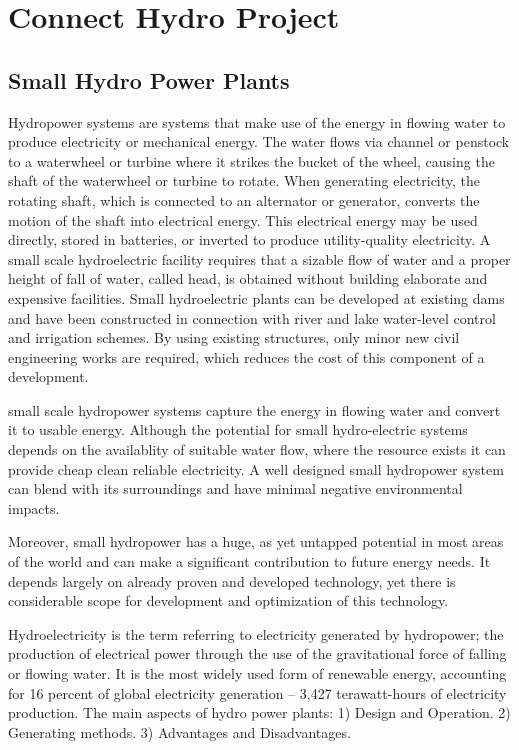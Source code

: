 \chapter{Connect Hydro Project}
\label{ChapterThree}
\section{Small Hydro Power Plants}
\label{SmallHydroPowerPlants}
Hydropower systems are systems that make use of the energy in flowing water to produce electricity or mechanical energy. The water flows via channel or penstock to a waterwheel or turbine where it strikes the bucket of the wheel, causing the shaft of the waterwheel or turbine to rotate. When generating electricity, the rotating shaft, which is connected to an alternator or generator, converts the motion of the shaft into electrical energy. This electrical energy may be used directly, stored in batteries, or inverted to produce utility-quality electricity. A small scale hydroelectric facility requires that a sizable flow of water and a proper height of fall of water, called head, is obtained without building elaborate and expensive facilities. Small hydroelectric plants can be developed at existing dams and have been constructed in connection with river and lake water-level control and irrigation schemes. By using existing structures, only minor new civil engineering works are required, which reduces the cost of this component of a development.

small scale hydropower systems capture the energy in flowing water and convert it to usable energy. Although the potential for small hydro-electric systems depends on the availablity of suitable water flow, where the resource exists it can provide cheap clean reliable electricity. A well designed small hydropower system can blend with its surroundings and have minimal negative environmental impacts.

Moreover, small hydropower has a huge, as yet untapped potential in most areas of the world and can make a significant contribution to future energy needs. It depends largely on already proven and developed technology, yet there is considerable scope for development and optimization of this technology.

Hydroelectricity is the term referring to electricity generated by hydropower; the production
of electrical power through the use of the gravitational force of falling or flowing water.
It is the most widely used form of renewable energy, accounting for 16 percent of global
electricity generation – 3,427 terawatt-hours of electricity production.
The main aspects of hydro power plants:
1) Design and Operation.
2) Generating methods.
3) Advantages and Disadvantages.


